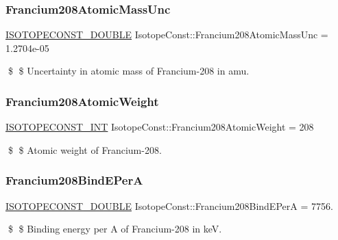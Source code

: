\subsubsection{\texorpdfstring{Francium208\+Atomic\+Mass\+Unc}{Francium208AtomicMassUnc}}
{\footnotesize\ttfamily \mbox{\hyperlink{group___isotope_const-_macros_ga8f45a7272ce02c0b4c65c44636ed719a}{I\+S\+O\+T\+O\+P\+E\+C\+O\+N\+S\+T\+\_\+\+D\+O\+U\+B\+LE}} Isotope\+Const\+::\+Francium208\+Atomic\+Mass\+Unc = 1.\+2704e-\/05}

\$ \$ Uncertainty in atomic mass of Francium-\/208 in amu. \mbox{\label{group___isotope_const-_francium-_fr208_ga5b434c9779274b7f8df9451bfe54877d}} 
\subsubsection{\texorpdfstring{Francium208\+Atomic\+Weight}{Francium208AtomicWeight}}
{\footnotesize\ttfamily \mbox{\hyperlink{group___isotope_const-_macros_ga5f18360b3e99483a35c32d789e62621c}{I\+S\+O\+T\+O\+P\+E\+C\+O\+N\+S\+T\+\_\+\+I\+NT}} Isotope\+Const\+::\+Francium208\+Atomic\+Weight = 208}

\$ \$ Atomic weight of Francium-\/208. \mbox{\label{group___isotope_const-_francium-_fr208_gabf069f53b24853e5b7e01afa8eab81b4}} 
\subsubsection{\texorpdfstring{Francium208\+Bind\+E\+PerA}{Francium208BindEPerA}}
{\footnotesize\ttfamily \mbox{\hyperlink{group___isotope_const-_macros_ga8f45a7272ce02c0b4c65c44636ed719a}{I\+S\+O\+T\+O\+P\+E\+C\+O\+N\+S\+T\+\_\+\+D\+O\+U\+B\+LE}} Isotope\+Const\+::\+Francium208\+Bind\+E\+PerA = 7756.}

\$ \$ Binding energy per A of Francium-\/208 in keV. \mbox{\label{group___isotope_const-_francium-_fr208_gaa68b3294325834bf2511fcaa9821fcc5}} 
